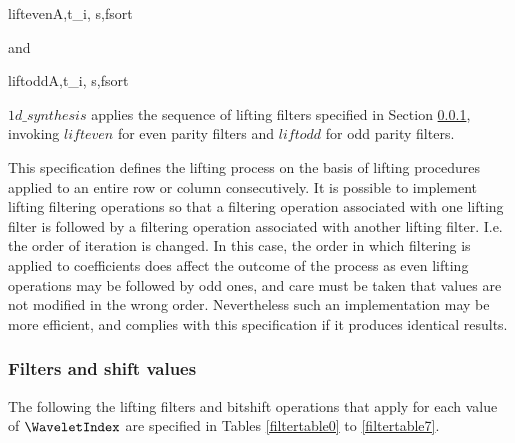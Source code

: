 \begin{pseudo}{lifteven}{A,t_i, s,fsort}
    \bsEND
    \bsELSE
\bsEND
\end{pseudo}

and

\begin{pseudo}{liftodd}{A,t_i, s,fsort}
    \bsEND
    \bsELSE
\bsEND\end{pseudo}

$1d\_synthesis$ applies the sequence of lifting filters specified in Section \ref{wltfilters},
invoking $lifteven$ for even parity filters and $liftodd$ for odd parity filters.

\begin{informative}
This specification defines the lifting process on the basis of lifting
procedures applied to an entire row or column consecutively. It is
possible to implement lifting filtering operations so that a filtering
operation associated with one lifting filter is followed by a filtering
operation associated with another lifting filter. I.e. the order of
iteration is changed. In this case, the order in which filtering is
applied to coefficients does affect the outcome of the process as even
lifting operations may be followed by odd ones, and care must be taken
that values are not modified in the wrong order. Nevertheless such an
implementation may be more efficient, and complies with this
specification if it produces identical results.
\end{informative}

\subsubsection{Filters and shift values}
\label{wltfilters}

The following the lifting filters and bitshift operations that
apply for each value of $\WaveletIndex$ are specified in Tables \ref{filtertable0} to
\ref{filtertable7}.

